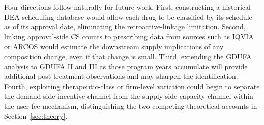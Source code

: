 Four directions follow naturally for future work. First, constructing a historical DEA scheduling database would allow each drug to be classified by its schedule as of its approval date, eliminating the retroactive-linkage limitation. Second, linking approval-side CS counts to prescribing data from sources such as IQVIA or ARCOS would estimate the downstream supply implications of any composition change, even if that change is small. Third, extending the GDUFA analysis to GDUFA II and III as those program years accumulate will provide additional post-treatment observations and may sharpen the identification. Fourth, exploiting therapeutic-class or firm-level variation could begin to separate the demand-side incentive channel from the supply-side capacity channel within the user-fee mechanism, distinguishing the two competing theoretical accounts in Section~\ref{sec:theory}.

